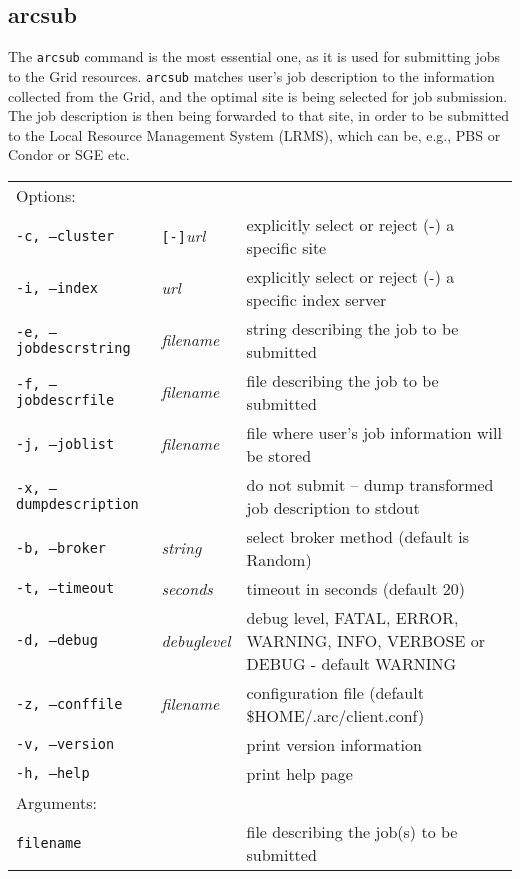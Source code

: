 \subsection{arcsub}\label{sec:arcsub}
The \texttt{arcsub} command is the
most essential one, as it is used for submitting jobs to the Grid
resources. \texttt{arcsub} matches user's job
description to the information collected from the Grid, and the
optimal site is being selected for job submission. The job description
is then being forwarded to that site, in order to be submitted to the
Local Resource Management System (LRMS), which can be, e.g., PBS or
Condor or SGE etc.

\hspace*{0.5cm}
\begin{shaded}
\end{shaded}
\begin{longtable}{llp{8cm}}
   Options:&&\\
   \texttt{-c, --cluster}&\verb#[-]#\textit{url}&explicitly select or reject (-) a specific site\\
   \texttt{-i, --index}&\textit{url}&explicitly select or reject (-) a specific index server\\
   \texttt{-e, --jobdescrstring}&\textit{filename}&string describing the job to be submitted\\
   \texttt{-f, --jobdescrfile}&\textit{filename}&file describing the job to be submitted\\
   \texttt{-j, --joblist}&\textit{filename}&file where user's job information will be stored\\
   \texttt{-x, --dumpdescription}&&do not submit -- dump transformed job description to stdout\\
   \texttt{-b, --broker}&\textit{string}&select broker method (default is Random)\\
   \texttt{-t, --timeout}&\textit{seconds}&timeout in seconds (default 20)\\
   \texttt{-d, --debug}&\textit{debuglevel}&debug level, FATAL, ERROR, WARNING, INFO, VERBOSE or DEBUG - default WARNING\\
   \texttt{-z, --conffile}&\textit{filename}& configuration file (default {\$}HOME/.arc/client.conf)\\
   \texttt{-v, --version}&&print version information\\
   \texttt{-h, --help}&&print help page\\
   Arguments:&&\\
   \texttt{filename}&&file describing the job(s) to be submitted\\
\end{longtable}

